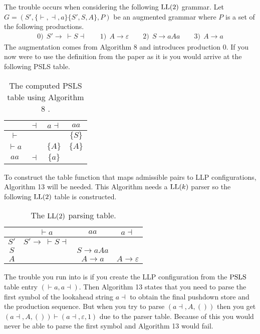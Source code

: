 The trouble occurs when considering the following $\text{LL}(2)$ grammar.
Let $G = (S', \{\vdash, \dashv, a\} \{S', S, A\}, P)$ be an augmented grammar where $P$ is a set of the following productions. 
\begin{align*}
    0)\:\: S' \to \: \vdash S \dashv \qquad 1)\:\: A \to \varepsilon \qquad 2)\:\: S \to aAa \qquad 3)\:\: A \to a
\end{align*}
The augmentation comes from Algorithm 8 \cite[13]{Vagner2007} and introduces production 0. If you now were to use the definition from the paper as it is you would arrive at the following PSLS table.
\begin{table}[H]
    \centering
    \begin{tabular}{c|c|c|c}
        & $\dashv$ & $a\dashv$ & $aa$ \\ \hline
        $\vdash$ & & & $\{S\}$ \\\hline
        $\vdash a$ & & $\{A\}$ & $\{A\}$ \\\hline
        $aa$ & $\dashv$ & $\{a\}$ & 
    \end{tabular}
    \caption{The computed PSLS table using Algorithm 8 \cite[13]{Vagner2007}.}
\end{table}
\noindent To construct the table function that maps admissible pairs to LLP configurations, Algorithm 13 \cite[15]{Vagner2007} will be needed. This Algorithm needs a $\text{LL}(k)$ parser so the following $\text{LL}(2)$ table is constructed.
\begin{table}[H]
    \centering
    \begin{tabular}{c|c|c|c}
        & $\vdash a$ & $aa$ & $a\dashv$ \\ \hline
        $S'$ & $S' \to \: \vdash S \dashv$ & & \\\hline
        $S$ & & $S \to aAa$ & \\\hline
        $A$ & & $A \to a$ & $A \to \varepsilon$
    \end{tabular}
    \caption{The $\text{LL}(2)$ parsing table.}
\end{table}
\noindent The trouble you run into is if you create the LLP configuration from the $\text{PSLS}$ table entry $(\vdash a,a \dashv)$. Then Algorithm 13 states that you need to parse the first symbol of the lookahead string $a \dashv$ to obtain the final pushdown store and the production sequence. But when you try to parse $(a \dashv, A, ())$ then you get $(a \dashv, A, ()) \vdash (a \dashv, \varepsilon, 1)$ due to the parser table. Because of this you would never be able to parse the first symbol and Algorithm 13 would fail.

